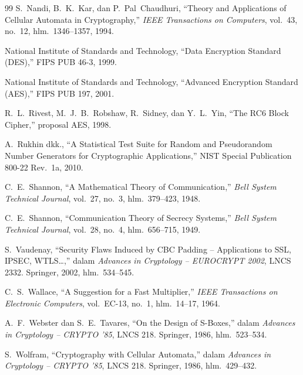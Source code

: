 \begin{thebibliography}{99}
S.~Nandi, B.~K.~Kar, dan P.~Pal~Chaudhuri, ``Theory and Applications of Cellular Automata in Cryptography,'' \textit{IEEE Transactions on Computers}, vol.~43, no.~12, hlm.~1346--1357, 1994.

National Institute of Standards and Technology, ``Data Encryption Standard (DES),'' FIPS PUB 46-3, 1999.

National Institute of Standards and Technology, ``Advanced Encryption Standard (AES),'' FIPS PUB 197, 2001.

R.~L.~Rivest, M.~J.~B.~Robshaw, R.~Sidney, dan Y.~L.~Yin, ``The RC6 Block Cipher,'' proposal AES, 1998.

A.~Rukhin dkk., ``A Statistical Test Suite for Random and Pseudorandom Number Generators for Cryptographic Applications,'' NIST Special Publication 800-22 Rev.~1a, 2010.

C.~E.~Shannon, ``A Mathematical Theory of Communication,'' \textit{Bell System Technical Journal}, vol.~27, no.~3, hlm.~379--423, 1948.

C.~E.~Shannon, ``Communication Theory of Secrecy Systems,'' \textit{Bell System Technical Journal}, vol.~28, no.~4, hlm.~656--715, 1949.

S.~Vaudenay, ``Security Flaws Induced by CBC Padding -- Applications to SSL, IPSEC, WTLS\ldots,'' dalam \textit{Advances in Cryptology -- EUROCRYPT 2002}, LNCS 2332. Springer, 2002, hlm.~534--545.

C.~S.~Wallace, ``A Suggestion for a Fast Multiplier,'' \textit{IEEE Transactions on Electronic Computers}, vol.~EC-13, no.~1, hlm.~14--17, 1964.

A.~F.~Webster dan S.~E.~Tavares, ``On the Design of S-Boxes,'' dalam \textit{Advances in Cryptology -- CRYPTO '85}, LNCS 218. Springer, 1986, hlm.~523--534.

S.~Wolfram, ``Cryptography with Cellular Automata,'' dalam \textit{Advances in Cryptology -- CRYPTO '85}, LNCS 218. Springer, 1986, hlm.~429--432.

\end{thebibliography}
